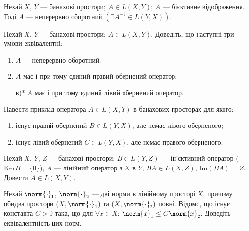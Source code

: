 
\begin{theory}
    \begin{theorem*}
        Нехай $X$, $Y$ --- банахові простори; $A \in L(X,Y)$;
        $A$ --- бієктивне  відображення. Тоді $A$ --- неперервно оборотний
        $\left(\exists A^{-1} \in L(Y,X)\right)$.
    \end{theorem*}
\end{theory}

\begin{exercise}
    Нехай $X$, $Y$ --- банахові простори; $A \in L(X,Y)$.
    Доведіть, що наступні три умови еквівалентні:
    \begin{enumerate}
        \item $A$ --- неперервно оборотний;
        \item $A$ має і при тому єдиний правий обернений оператор;
        \item[в)*] $A$ має і при тому єдиний лівий обернений оператор.
    \end{enumerate}
\end{exercise}

\begin{exercise}
    Навести приклад оператора $A \in L(X,Y)$ в банахових просторах для якого:
    \begin{enumerate}
        \item існує правий обернений $B\in L(Y,X)$, але немає лівого оберненого;
        \item існує лівий обернений $C\in L(Y,X)$, але немає правого оберненого.
    \end{enumerate}
\end{exercise}

\begin{exercise}
    Нехай $X$, $Y$, $Z$ --- банахові простори; $B \in L(Y,Z)$ --- ін'єктивний
    оператор ($\mathrm{Ker}B = \{0\}$); $A$ --- лінійний оператор з $X$ в $Y$;
    $BA \in L(X,Z)$, $\mathrm{Im}(BA) = Z$. Довести $A \in L(X,Y)$.
\end{exercise}

\begin{exercise}
    Нехай $\norm{\cdot}_1$, $\norm{\cdot}_2$  --- дві норми в лінійному просторі
    $X$, причому обидва простори $(X, \norm{\cdot}_1)$ та $(X, \norm{\cdot}_2)$ 
    повні. Відомо, що існує константа $C > 0$ така, що для $\forall x \in X$:
    $\norm{x}_1 \leq C \norm{x}_2$. Доведіть еквівалентність цих норм.
\end{exercise}

